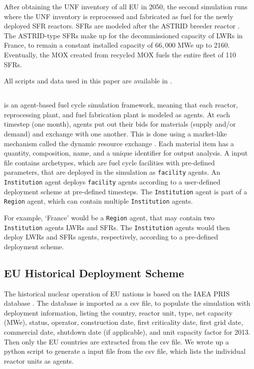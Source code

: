 After obtaining the \gls{UNF} inventory of all \gls{EU} in 2050, the second
simulation runs where the \gls{UNF} inventory is reprocessed and fabricated
as fuel for the newly deployed \gls{SFR} reactors.
\glspl{SFR} are modeled after the ASTRID breeder reactor \cite{varaine_pre-conceptual_2012}.
The ASTRID-type \glspl{SFR} make up for the decommissioned capacity
of \glspl{LWR} in France, to remain a constant installed capacity of $66,000$ MWe up to 2160.
Eventually, the  \gls{MOX} created from recycled \gls{MOX}
fuels the entire fleet of 110 \glspl{SFR}.

All scripts and data used
in this paper are available in \cite{bae_arfc/transition-scenarios:_2017}.

\subsection{\Cyclus}
\Cyclus is an agent-based fuel cycle simulation framework, meaning that
each reactor, reprocessing plant, and fuel fabrication plant is modeled as agents. At each timestep (one month),
agents put out their bids for materials (supply and/or demand) and exchange
with one another. This is done using a market-like mechanism called the 
dynamic resource exchange \cite{gidden_agent-based_2015}.
Each material item has a quantity, composition, name, and a unique identifier
for output analysis. 
A \Cyclus input file contains archetypes, which are fuel cycle facilities with
pre-defined parameters, that are deployed in the simulation as \texttt{facility} agents.
An \texttt{Institution} agent deploys \texttt{facility} agents
according to a user-defined deployment scheme at pre-defined timesteps.
The \texttt{Institution} agent is part of a \texttt{Region} agent,
which can contain multiple \texttt{Institution} agents.

For example, `France' would be a \texttt{Region} agent,
that may contain two \texttt{Institution} agents \glspl{LWR}
and \glspl{SFR}. The \texttt{Institution} agents would then deploy
\glspl{LWR} and \glspl{SFR} agents, respectively, according to a pre-defined deployment
scheme.


\subsection{\gls{EU} Historical Deployment Scheme}

The historical nuclear operation of \gls{EU} nations is based on
the \gls{IAEA} \gls{PRIS} database \cite{iaea_nuclear_2017}. The database is imported as a csv file, to populate the simulation
with deployment information, listing the country, reactor unit, type, net capacity (MWe), status,
operator, construction date, first criticality date, first grid date, commercial date, shutdown
date (if applicable), and unit capacity factor for 2013. Then only the \gls{EU} countries are extracted
from the csv file. We wrote up a python script to generate a \Cyclus input file from the csv file,
which lists the individual reactor units as agents. 

